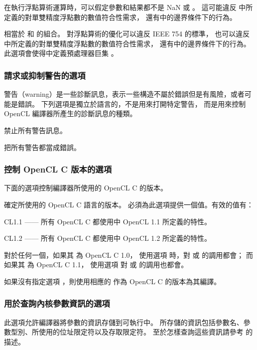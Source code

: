 在執行浮點算術運算時，可以假定參數和結果都不是 NaN 或 \math{\pm\infty}。
這可能違反 中所定義的對單雙精度浮點數的數值符合性需求，
還有中的邊界條件下的行為。
\stopclOption

相當於  和  的組合。
對浮點算術的優化可以違反 IEEE 754 的標準，
也可以違反 中所定義的對單雙精度浮點數的數值符合性需求，
還有中的邊界條件下的行為。
此選項會使得中定義預處理器巨集 。
\stopclOption

\subsubsection{請求或抑制警告的選項}

警告（warning）是一些診斷訊息，表示一些構造不屬於錯誤但是有風險，或者可能是錯誤。
下列選項是獨立於語言的，不是用來打開特定警告，
而是用來控制 OpenCL 編譯器所產生的診斷訊息的種類。

禁止所有警告訊息。
\stopclOption

把所有警告都當成錯誤。
\stopclOption

\subsubsection[sec:ctrlcveroption]{控制 OpenCL C 版本的選項}

下面的選項控制編譯器所使用的 OpenCL C 的版本。

確定所使用的 OpenCL C 語言的版本。
必須為此選項提供一個值。有效的值有：
\startigBase
\item CL1.1 —— 所有 OpenCL C 都使用中 OpenCL 1.1 所定義的特性。
\item CL1.2 —— 所有 OpenCL C 都使用中 OpenCL 1.2 所定義的特性。
\stopigBase
\stopclOption

對於任何一個，如果其  為 OpenCL C 1.0，
使用選項  時，對  或  的調用都會{}；
而如果其  為 OpenCL C 1.1，
使用選項  對  或  的調用也都會{}。

如果沒有指定選項 ，則使用相應的  作為 OpenCL C 的版本為其編譯。

\subsubsection{用於查詢內核參數資訊的選項}

此選項允許編譯器將參數的資訊存儲到可執行中。
所存儲的資訊包括參數名、參數型別、所使用的位址限定符以及存取限定符。
至於怎樣查詢這些資訊請參考  的描述。
\stopclOption

